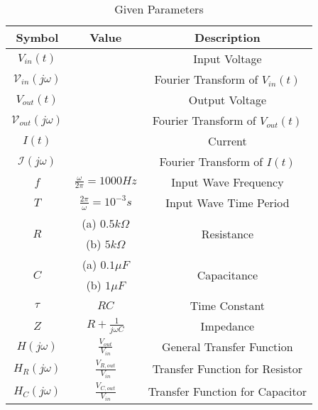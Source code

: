 \begin{table}[!h]
    \centering
    \begin{tabular}{|c|c|c|}
    \hline
       \textbf{Symbol}  & \textbf{Value} &  \textbf{Description}\\
    \hline
       $V_{in}(t)$  &  &  Input Voltage\\
    \hline
        $\mathcal{V}_{in}(j\omega)$ & & Fourier Transform of $V_{in}(t)$\\
    \hline
        $V_{out}(t)$ & & Output Voltage\\
    \hline
        $\mathcal{V}_{out}(j\omega)$ & & Fourier Transform of $V_{out}(t)$\\
    \hline
        $I(t)$ & & Current\\
    \hline
        $\mathcal{I}(j\omega)$ & & Fourier Transform of $I(t)$\\
    \hline
        $f$ & $\frac{\omega}{2\pi} = 1000Hz$ & Input Wave Frequency\\
    \hline
        $T$ & $\frac{2\pi}{\omega} = 10^{-3} s$ & Input Wave Time Period\\
    \hline
        \multirow{2}{*}{$R$} & (a) $0.5k\Omega$ & \multirow{2}{*}{Resistance}\\
        \cline{2-2}
        & (b) $5k\Omega$ &\\
        \cline{2-2}
    \hline
        \multirow{2}{*}{$C$} & (a) $0.1\mu F$ & \multirow{2}{*}{Capacitance}\\
        \cline{2-2}
        & (b) $1\mu F$ &\\
        \cline{2-2}
    \hline
        $\tau$ & $RC$ & Time Constant\\
    \hline
        $Z$ & $R + \frac{1}{j\omega C}$ & Impedance\\
    \hline
        $H(j\omega)$ & $\frac{V_{out}}{V_{in}}$ & General Transfer Function\\
    \hline
        $H_{R}(j\omega)$ & $\frac{V_{R, out}}{V_{in}}$ & Transfer Function for Resistor\\
    \hline
        $H_{C}(j\omega)$ & $\frac{V_{C, out}}{V_{in}}$ & Transfer Function for Capacitor\\
    \hline
    \end{tabular}
    \caption{Given Parameters}
    \label{tab:1_gate.23.ph.37}
\end{table}
